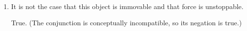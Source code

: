 \begin{enumerate}
\begin{enumerate}[label=\Alph*.]
    \item It is not the case that this object is immovable and that force is unstoppable.\\
    \begin{subanswer}
      True. (The conjunction  is conceptually incompatible, so its negation is true.)
    \end{subanswer}
  \end{enumerate}















\end{enumerate}
